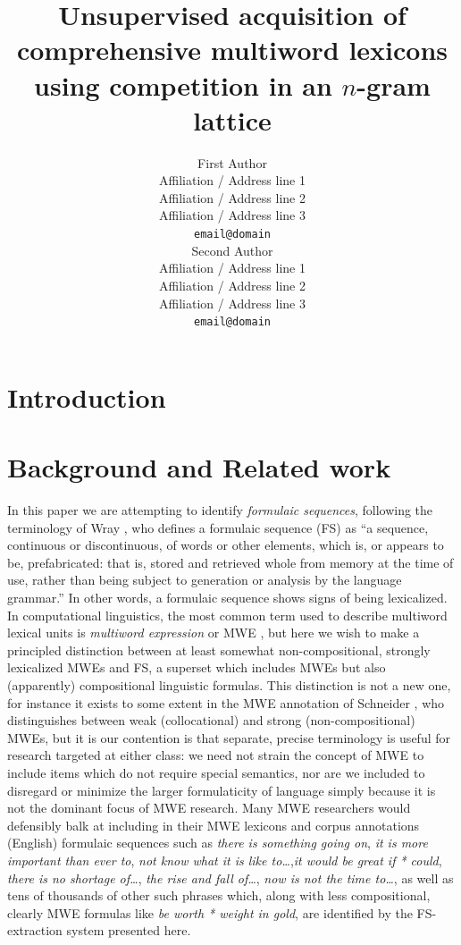 \documentclass[11pt]{article}
\title{Unsupervised acquisition of comprehensive multiword lexicons \\ using competition in an $n$-gram lattice}
\author{First Author \\
  Affiliation / Address line 1 \\
  Affiliation / Address line 2 \\
  Affiliation / Address line 3 \\
  {\tt email@domain} \\\And
  Second Author \\
  Affiliation / Address line 1 \\
  Affiliation / Address line 2 \\
  Affiliation / Address line 3 \\
  {\tt email@domain} \\}
\date{}
\begin{document}
\maketitle
\begin{abstract}

\end{abstract}

\section{Introduction}

\section{Background and Related work}

In this paper we are attempting to identify \textit{formulaic sequences}, following the terminology of Wray , who defines a formulaic sequence (FS) as ``a sequence, continuous or discontinuous, of words or other elements, which is, or appears to be, prefabricated: that is, stored and retrieved whole from memory at the time of use, rather than being subject to generation or analysis by the language grammar.'' In other words, a formulaic sequence shows signs of being lexicalized. In computational linguistics, the most common term used to describe multiword lexical units is \textit{multiword expression} or MWE \cite{Baldwin10}, but here we wish to make a principled distinction between at least somewhat non-compositional, strongly lexicalized MWEs and FS, a superset which includes MWEs but also (apparently) compositional linguistic formulas. This distinction is not a new one, for instance it exists to some extent in the MWE annotation of Schneider \cite{Schneider14a}, who distinguishes between weak (collocational) and strong (non-compositional) MWEs, but it is our contention is that separate, precise terminology is useful for research targeted at either class: we need not strain the concept of MWE to include items which do not require special semantics, nor are we included to disregard or minimize the larger formulaticity of language simply because it is not the dominant focus of MWE research. Many MWE researchers would defensibly balk at including in their MWE lexicons and corpus annotations (English) formulaic sequences such as \emph{there is something going on}, \emph{it is more important than ever to\ldotz}, \emph{\ldotsdo not know what it is like to\ldots},\emph{it would be great if * could}, \emph{there is no shortage of\ldots}, \emph{the rise and fall of\ldots}, \emph{now is not the time to\ldots}, \etc as well as tens of thousands of other such phrases which, along with less compositional, clearly MWE formulas like \textit{be worth * weight in gold}, are identified by the FS-extraction system presented here.
\end{document}
